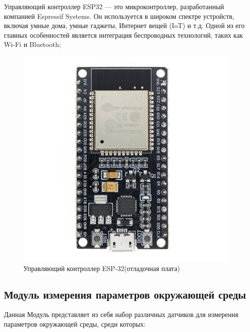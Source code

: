 
Управляющий контроллер ESP32 --- это микроконтроллер, разработанный компанией Espressif Systems. Он используется в широком спектре устройств, включая умные дома, умные гаджеты, Интернет вещей (IoT) и т.д. Одной из его главных особенностей является интеграция беспроводных технологий, таких как Wi-Fi и Bluetooth;

\begin{figure}[H]
    \centering
    \includegraphics[scale=0.45]{images/esp.jpg}
    \caption{Управляющий контроллер ESP-32(отладочная плата)}
    \label{fig:esp}
\end{figure}

\subsection{Модуль измерения параметров окружающей среды}

Данная Модуль представляет из себя набор различных датчиков для измерения параметров окружающей среды, среди которых:

